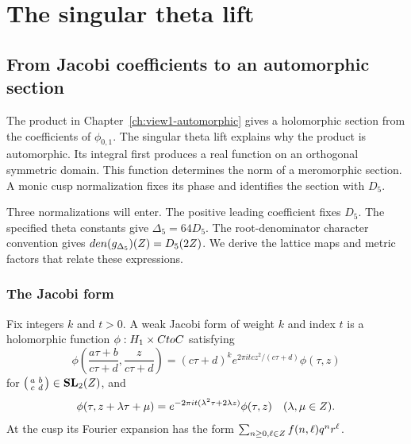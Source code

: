 \providecommand{\Mp}{\mathbf{Mp}}
\providecommand{\Spin}{\mathbf{Spin}}
\providecommand{\Pf}{\operatorname{Pf}}
\providecommand{\Un}{\mathbf{U}}

\chapter{The singular theta lift}
\label{ch:singular-theta-lift}

\section{From Jacobi coefficients to an automorphic section}
\label{sec:singular-theta-lift}
\label{ssec:theta-lift-notation}

The product in Chapter~\ref{ch:view1-automorphic} gives a holomorphic
section from the coefficients of \(\phi_{0,1}\).
The singular theta lift explains why the product is automorphic.
Its integral first produces a real function on an orthogonal
symmetric domain.  This function determines the norm of a
meromorphic section.  A monic cusp normalization fixes its phase
and identifies the section with \(D_5\).

Three normalizations will enter.  The positive leading coefficient
fixes \(D_5\).  The specified theta constants
give \(\Delta_5=64D_5\).  The root-denominator character convention
gives \(den({g_{\Delta_5}})(Z)=D_5(2Z)\).
We derive the lattice maps and metric factors that relate these
expressions.

\subsection{The Jacobi form}
\label{ssec:phi01}

\begin{definition}
\label{def:weak-jacobi-phi01}
Fix integers \(k\) and \(t>0\).
A weak Jacobi form of weight \(k\) and index \(t\) is a
holomorphic function \(\phi:H_1\times CtoC\)
satisfying
\[
 \phi\!\left(\frac{a\tau+b}{c\tau+d},\frac z{c\tau+d}\right)
 =(c\tau+d)^k e^{2\pi itcz^2/(c\tau+d)}\phi(\tau,z)
\]
for \(\bigl(\begin{smallmatrix}a&b\\c&d\end{smallmatrix}\bigr)
\in\mathbf{SL}_2(Z)\), and
\[
 \phi(\tau,z+\lambda\tau+\mu)
 =e^{-2\pi it(\lambda^2\tau+2\lambda z)}\phi(\tau,z)
 \quad(\lambda,\mu\in Z).
\]
At the cusp its Fourier expansion has the form
\(\sum_{n\geq0,\ell\in Z}f(n,\ell)q^nr^\ell\).
\end{definition}

